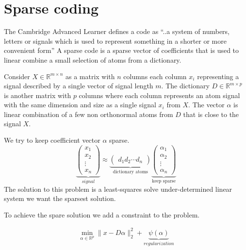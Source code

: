 \section{Sparse coding}

The Cambridge Advanced Learner defines a code as ``..a system of numbers, letters or signals which is used to represent something in a shorter or more convenient form''
A sparse code is a sparse vector of coefficients that is used to linear combine a small selection of atoms from a dictionary.


Consider $X \in \mathbb{R}^{m\times n}$  as a matrix with $n$ columns each column $x_{i}$ representing a signal described by a single vector of signal length $m$.
The dictionary $D\in\mathbb{R}^{m \times p}$ is another matrix with $p$ columns where each column represents an atom signal with the same dimension and size as a single signal $x_{i}$ from $X$.
The vector $\alpha$ is linear combination of a few non orthonormal atoms from $D$ that is close to the signal $X$.

We try to keep coefficient vector $\alpha$ sparse. 
\[
\underbrace{\begin{pmatrix} x_1 \\ x_2 \\ \vdots \\ x_n \end{pmatrix}}_{signal} \approx \underbrace{\begin{pmatrix} d_1  d_2 \cdots d_n \end{pmatrix}}_{\textrm{dictionary atoms}}
\underbrace{\begin{pmatrix} \alpha_1 \\ \alpha_2 \\ \vdots \\ \alpha_n \end{pmatrix}}_{\textrm{keep sparse}}
\]
The solution to this problem is a least-squares solve under-determined linear system we want the sparsest solution.

To achieve the spare solution we add a constraint to the problem. 

\begin{align}
\min_{\alpha\in\mathbb{R}^{p}} \lVert x - D\alpha \rVert^{2}_{2} + \underbrace{\psi(\alpha)}_{regularization}
\end{align}


